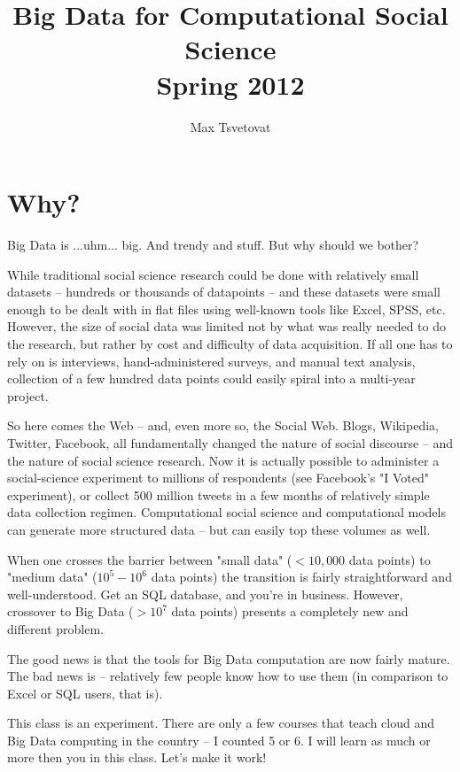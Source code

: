 \documentclass[12pt]{article}
\title{Big Data for Computational Social Science\\Spring 2012}
\author{Max Tsvetovat}
\begin{document}
\maketitle

\section{Why?}

Big Data is ...uhm... big. And trendy and stuff. But why should we bother?

While traditional social science research could be done with relatively small datasets -- hundreds or thousands of datapoints -- and these datasets were small enough to be dealt with in flat files using well-known tools like Excel, SPSS, etc. However, the size of social data was limited not by what was really needed to do the research, but rather by cost and difficulty of data acquisition. If all one has to rely on is interviews, hand-administered surveys, and manual text analysis, collection of a few hundred data points could easily spiral into a multi-year project.

So here comes the Web -- and, even more so, the Social Web. Blogs, Wikipedia, Twitter, Facebook, all fundamentally changed the nature of social discourse -- and the nature of social science research. Now it is actually possible to administer a social-science experiment to millions of respondents (see Facebook's "I Voted" experiment), or collect 500 million tweets in a few months of relatively simple data collection regimen. Computational social science and computational models can generate more structured data -- but can easily top these volumes as well.

When one crosses the barrier between "small data" ($< 10,000$ data points) to "medium data" ($10^5-10^6$ data points) the transition is fairly straightforward and well-understood. Get an SQL database, and you're in business. However, crossover to Big Data ($>10^7$ data points) presents a completely new and different problem. 

The good news is that the tools for Big Data computation are now fairly mature. The bad news is -- relatively few people know how to use them (in comparison to Excel or SQL users, that is).

This class is an experiment. There are only a few courses that teach cloud and Big Data computing in the country -- I counted 5 or 6. I will learn as much or more then you in this class. Let's make it work!
\end{document}
